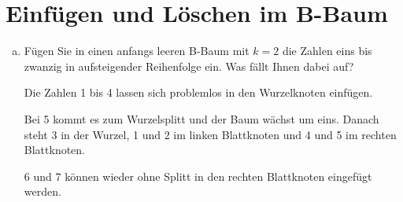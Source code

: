 \section{Einfügen und Löschen im B-Baum}

\begin{enumerate}[a)]
	\item Fügen Sie in einen anfangs leeren B-Baum mit $k=2$ die Zahlen eins bis zwanzig in aufsteigender Reihenfolge ein. Was fällt Ihnen dabei auf?

\begin{solution}
Die Zahlen 1 bis 4 lassen sich problemlos in den Wurzelknoten einfügen.
\begin{center}
\end{center}

Bei 5 kommt es zum Wurzelsplitt und der Baum wächst um eins. Danach steht 3 in der Wurzel, 1 und 2 im linken Blattknoten und 4 und 5 im rechten Blattknoten.

\begin{center}
\end{center}

6 und 7 können wieder ohne Splitt in den rechten Blattknoten eingefügt werden.

\begin{center}
\end{center}
\end{solution}
\end{enumerate}

